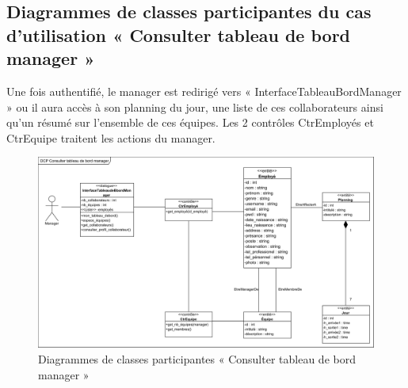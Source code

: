 \begin{itemize}
        \subsection*{Diagrammes de classes participantes du cas d'utilisation « Consulter tableau de bord manager »}
        Une fois authentifié, le manager est redirigé vers « InterfaceTableauBordManager » ou il aura accès à son planning du jour, une liste de ces collaborateurs ainsi qu’un résumé sur l’ensemble de ces équipes. Les 2 contrôles CtrEmployés et CtrEquipe traitent les actions du manager. 
            \vspace{-10pt}
            \begin{figure}[h!]
                 \centering
                \includegraphics[scale=0.68,angle=90]{images/DCP/DCP Consulter tableau de bord manager.png}
                 \caption{Diagrammes de classes participantes « Consulter tableau de bord manager »}
                 \label{fig27}
            \end{figure}
        \clearpage
       

\end{itemize}
